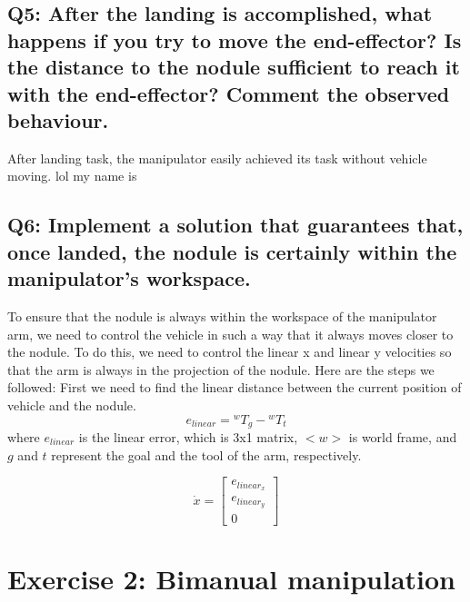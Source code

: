 \documentclass{article}
\begin{document}
\subsection{Q5: After the landing is accomplished, what happens if you try to move the end-effector? Is the distance to the nodule sufficient to reach it with the end-effector? Comment the observed behaviour.}
After landing task, the manipulator easily achieved its task without vehicle moving. 
lol my name is 
\subsection{Q6: Implement a solution that guarantees that, once landed, the nodule is certainly within the manipulator's workspace.}
To ensure that the nodule is always within the workspace of the manipulator arm, we need to control the vehicle in such a way that it always moves closer to the nodule. To do this, we need to control the linear x and linear y velocities so that the arm is always in the projection of the nodule. Here are the steps we followed:
First we need to find the linear distance between the current position of vehicle and the nodule.   
    $$e_{linear}  = {}^{w}T_{g} - {}^{w}T_{t}$$
where $e_{linear}$ is the linear error, which is 3x1 matrix, $<w>$ is world frame, and $g$ and $t$ represent the goal and the tool of the arm, respectively.

$$\dot{x} = \begin{bmatrix}
		e_{linear_x} \\
            e_{linear_y} \\
            0
		\end{bmatrix} $$


\clearpage
\section{Exercise 2: Bimanual manipulation}
\end{document}

